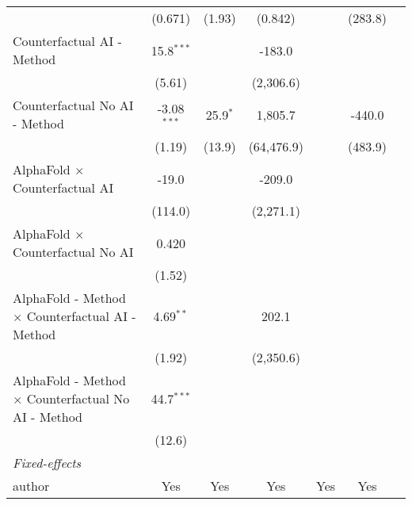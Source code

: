 \begin{tabular}{lcccccc}
                                                              & (0.671)       & (1.93)        & (0.842)    &                       & (283.8) &   \\   
   Counterfactual AI - Method                                 & 15.8$^{***}$  &               & -183.0     &                       &         &   \\   
                                                              & (5.61)        &               & (2,306.6)  &                       &         &   \\   
   Counterfactual No AI - Method                              & -3.08$^{***}$ & 25.9$^{*}$    & 1,805.7    &                       & -440.0  &   \\   
                                                              & (1.19)        & (13.9)        & (64,476.9) &                       & (483.9) &   \\   
   AlphaFold $\times$ Counterfactual AI                       & -19.0         &               & -209.0     &                       &         &   \\   
                                                              & (114.0)       &               & (2,271.1)  &                       &         &   \\   
   AlphaFold $\times$ Counterfactual No AI                    & 0.420         &               &            &                       &         &   \\   
                                                              & (1.52)        &               &            &                       &         &   \\   
   AlphaFold - Method $\times$ Counterfactual AI - Method     & 4.69$^{**}$   &               & 202.1      &                       &         &   \\   
                                                              & (1.92)        &               & (2,350.6)  &                       &         &   \\   
   AlphaFold - Method $\times$ Counterfactual No AI - Method  & 44.7$^{***}$  &               &            &                       &         &   \\   
                                                              & (12.6)        &               &            &                       &         &   \\   
   \midrule
   \emph{Fixed-effects}\\
   author                                                     & Yes           & Yes           & Yes        & Yes                   & Yes     & \\  

\end{tabular}
